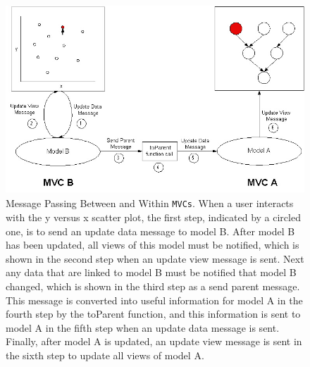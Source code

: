 \documentclass{article}[11pt]
\newcommand{\Rfunction}[1]{{\textsf{#1}}}
\newcommand{\Robject}[1]{{\texttt{#1}}}
\begin{document}
\begin{figure}[ht]
  \begin{center}
    \includegraphics[height=2.8in, width=4.5in]{newMP.jpg}
    \caption{ Message Passing Between and Within \Robject{MVCs}.  When a user
      interacts with the y versus x scatter plot, the first step, indicated by
      a circled one, is to send an update data message to model B.  After
      model B has been updated, all views of this model must be notified, which
      is shown in the second step when an update view message is sent.  Next
      any data that are linked to model B must be notified that model B
      changed, which is shown in the third step as a send parent message.
      This message is converted into useful information for model A in
      the fourth step by the \Rfunction{toParent} function, and this
      information is sent to model A in the fifth step when an update data
      message is sent.  Finally, after model A is updated, an update view
      message is sent in the sixth step to update all views of model A. }
    \label{Fig:MessPass}
  \end{center}
\end{figure}

\end{document}

